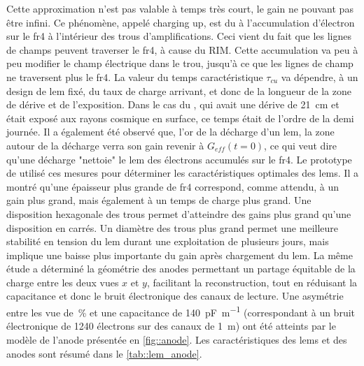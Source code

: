      Cette approximation n'est pas valable à temps très court, le gain ne pouvant pas être infini. Ce phénomène, appelé charging up, est du à l'accumulation d'électron sur le \gls{fr4} à l'intérieur des trous d'amplifications. Ceci vient du fait que les lignes de champs peuvent traverser le \gls{fr4}, à cause du RIM. Cette accumulation va peu à peu modifier le champ électrique dans le trou, jusqu'à ce que les lignes de champ ne traversent plus le \gls{fr4}. La valeur du temps caractéristique $\tau_{cu}$ va dépendre, à un design de \gls{lem} fixé, du taux de charge arrivant, et donc de la longueur de la zone de dérive et de l'exposition. Dans le cas du \threeL{}, qui avait une dérive de \SI{21}{\centi\meter} et était exposé aux rayons cosmique en surface, ce temps était de l'ordre de la demi journée. Il a également été observé que, l'or de la décharge d'un \gls{lem}, la zone autour de la décharge verra son gain revenir à $G_{eff}(t=0)$, ce qui veut dire qu'une décharge "nettoie" le \gls{lem} des électrons accumulés sur le \gls{fr4}. Le prototype de \threeL{} utilisé ces mesures pour déterminer les caractéristiques optimales des \glspl{lem}. Il a montré qu'une épaisseur plus grande de \gls{fr4} correspond, comme attendu, à un gain plus grand, mais également à un temps de charge plus grand. Une disposition hexagonale des trous permet d'atteindre des gains plus grand qu'une disposition en carrés. Un diamètre des trous plus grand permet une meilleure stabilité en tension du \gls{lem} durant une exploitation de plusieurs jours, mais implique une baisse plus importante du gain après chargement du \gls{lem}. La même étude a déterminé la géométrie des anodes permettant un partage équitable de la charge entre les deux vues $x$ et $y$, facilitant la reconstruction, tout en réduisant la capacitance et donc le bruit électronique des canaux de lecture. Une asymétrie entre les vue de \,\% et une capacitance de \SI{140}{\pico\farad\per\meter} (correspondant à un bruit électronique de 1240 électrons sur des canaux de \SI{1}{\meter}) ont été atteints par le modèle de l'anode présentée en \autoref{fig::anode}. Les caractéristiques des \glspl{lem} et des anodes sont résumé dans le \autoref{tab::lem_anode}.


